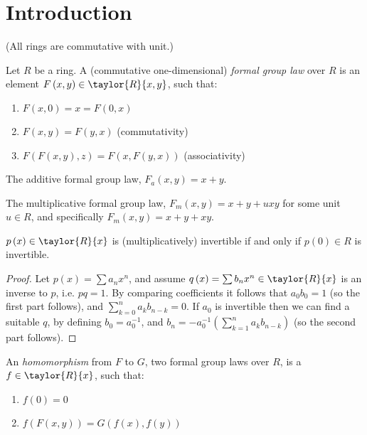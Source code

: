 \section{Introduction}

(All rings are commutative with unit.)

\begin{definition*}
	Let $R$ be a ring.
	A (commutative one-dimensional) \emph{formal group law} over $R$ is an element $F\left(x,y\right) \in \taylor{R}{x,y}$, such that:
	\begin{enumerate}
		\item $F\left(x,0\right) = x = F\left(0,x\right)$
		\item $F\left(x,y\right)=F\left(y,x\right)$ (commutativity) 
		\item $F\left(F\left(x,y\right),z\right)=F\left(x,F\left(y,x\right)\right)$ (associativity)
	\end{enumerate}
\end{definition*}

\begin{example*}
	The additive formal group law, $F_a\left(x,y\right) = x+y$.
\end{example*}

\begin{example*}
	The multiplicative formal group law, $F_m\left(x,y\right) = x+y+uxy$ for some unit $u\in R$, and specifically $F_m\left(x,y\right) = x+y+xy$.
\end{example*}

\begin{lemma*}
	$p\left(x\right) \in \taylor{R}{x}$ is (multiplicatively) invertible if and only if $p\left(0\right) \in R$ is invertible.
\end{lemma*}
\begin{proof}
	Let $p\left(x\right) = \sum a_n x^n$, and assume $q\left(x\right) = \sum b_n x^n \in \taylor{R}{x}$ is an inverse to $p$, i.e. $pq = 1$. 
	By comparing coefficients it follows that $a_0 b_0 = 1$ (so the first part follows), and $\sum_{k=0}^n a_k b_{n-k} = 0$.
	If $a_0$ is invertible then we can find a suitable $q$, by defining $b_0 = a_0^{-1}$, and $b_n = - a_0^{-1} \left(\sum_{k=1}^n a_k b_{n-k}\right)$ (so the second part follows).
\end{proof}

\begin{definition*}
	An \emph{homomorphism} from $F$ to $G$, two formal group laws over $R$, is a $f \in \taylor{R}{x}$, such that:
	\begin{enumerate}
		\item $f\left(0\right) = 0$
		\item $f\left(F\left(x,y\right)\right) = G\left(f\left(x\right),f\left(y\right)\right)$
	\end{enumerate}
\end{definition*}

